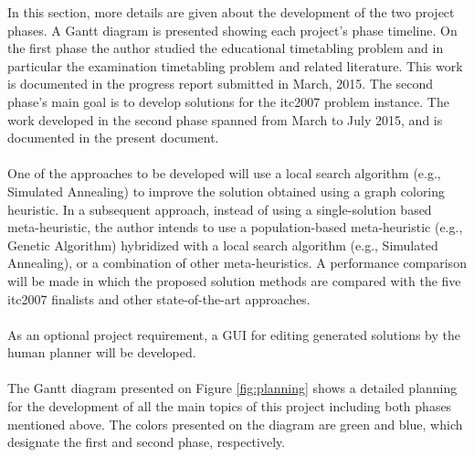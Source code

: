 In this section, more details are given about the development of the two project phases. A Gantt diagram is presented showing each project's phase timeline. On the first phase the author studied the educational timetabling problem and in particular the examination timetabling problem and related literature. This work is documented in the progress report submitted in March, 2015. The second phase's main goal is to develop solutions for the \gls{itc2007} problem instance. The work developed in the second phase spanned from March to July 2015, and is documented in the present document.\\
\\
One of the approaches to be developed will use a local search algorithm (e.g., Simulated Annealing) to improve the solution obtained using a graph coloring heuristic. In a subsequent approach, instead of using a single-solution based meta-heuristic, the author intends to use a population-based meta-heuristic (e.g., Genetic Algorithm) hybridized with a local
search algorithm (e.g., Simulated Annealing), or a combination of other meta-heuristics. A performance comparison will be made in which the proposed solution methods are compared with the five \gls{itc2007} finalists and other state-of-the-art approaches. \\
\\
As an optional project requirement, a GUI for editing generated solutions by the human planner will be developed.\\
\\
The Gantt diagram presented on Figure \ref{fig:planning} shows a detailed planning for the development of all the main topics of this project including both phases mentioned above. The colors presented on the diagram are green and blue, which designate the first and second phase, respectively.\\

